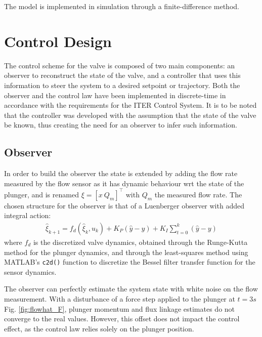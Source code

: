 \documentclass[letterpaper, 10pt, conference]{ieeeconf}
\begin{document}
The model is implemented in simulation through a finite-difference method.

\section{Control Design}\label{sec:ctrl}
The control scheme for the valve is composed of two main components: an observer to reconstruct the state of the valve, and a controller that uses this information to steer the system to a desired setpoint or trajectory. Both the observer and the control law have been implemented in discrete-time in accordance with the requirements for the ITER Control System. It is to be noted that the controller was developed with the assumption that the state of the valve be known, thus creating the need for an observer to infer such information.

\subsection{Observer}
In order to build the observer the state is extended by adding the flow rate measured by the flow sensor as it has dynamic behaviour wrt the state of the plunger, and is renamed $\xi = [x \ Q_m]^\top$ with $Q_m$ the measured flow rate.
The chosen structure for the observer is that of a Luenberger observer with added integral action:
\begin{align}
    \hat{\xi}_{k+1} = f_d(\hat{\xi}_k, u_k) + K_P(\hat{y}-y) + K_I \displaystyle\sum_{t=0}^{k}(\hat{y}-y)
\end{align}
where $f_d$ is the discretized valve dynamics, obtained through the Runge-Kutta method for the plunger dynamics, and through the least-squares method using MATLAB's \verb|c2d()| function to discretize the Bessel filter transfer function for the sensor dynamics. 

The observer can perfectly estimate the system state with white noise on the flow measurement. With a disturbance of a force step applied to the plunger at $t=3s$ Fig. \ref{fig:flowhat_F}, plunger momentum and flux linkage estimates do not converge to the real values. However, this offset does not impact the control effect, as the control law relies solely on the plunger position.
\end{document}
